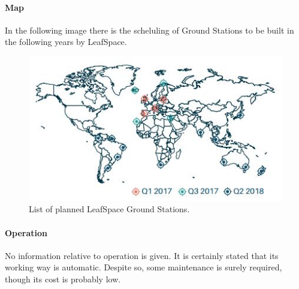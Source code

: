 \paragraph{Map}
In the following image there is the scheluling of Ground Stations to be built in the following years by LeafSpace. 
\begin{figure}[H]
\begin{center}
\includegraphics[scale=1]{LeafSpace.jpg}
\caption[LeafSpace Ground Stations]{List of planned LeafSpace Ground Stations.}
\label{fig:LeafSpace}
\end{center}
\end{figure}

\paragraph{Operation}
No information relative to operation is given. It is certainly stated that its working way is automatic. Despite so, some maintenance is surely required, though its cost is probably low.

